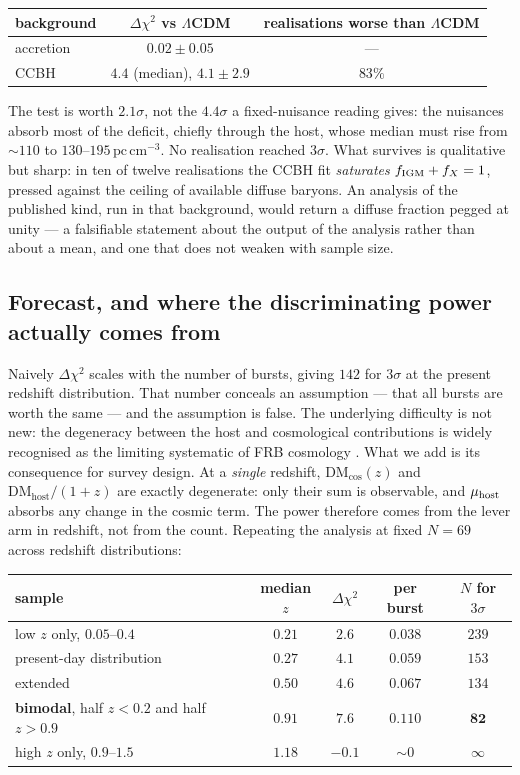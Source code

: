 \documentclass[11pt,a4paper]{article}
\begin{document}
\begin{center}
\begin{tabular}{lcc}
\toprule
background & $\Delta\chi^2$ vs $\Lambda$CDM & realisations worse than $\Lambda$CDM \\
\midrule
accretion & $0.02 \pm 0.05$ & --- \\
CCBH & $4.4$ (median), $4.1\pm2.9$ & $83\%$ \\
\bottomrule
\end{tabular}
\end{center}

The test is worth $2.1\sigma$, not the $4.4\sigma$ a fixed-nuisance reading gives: the nuisances absorb most of the deficit, chiefly
through the host, whose median must rise from $\sim\!110$ to $130$--$195\,\mathrm{pc\,cm^{-3}}$. No
realisation reached $3\sigma$. What survives is qualitative but sharp: in ten of twelve
realisations the CCBH fit \emph{saturates} $f_{\rm IGM}+f_X = 1$, pressed against the ceiling of
available diffuse baryons. An analysis of the published kind, run in that background, would return
a diffuse fraction pegged at unity --- a falsifiable statement about the output of the analysis
rather than about a mean, and one that does not weaken with sample size.

\subsection{Forecast, and where the discriminating power actually comes from}
Naively $\Delta\chi^2$ scales with the number of bursts, giving $142$ for $3\sigma$ at the present
redshift distribution. That number conceals an assumption --- that all bursts are worth the same ---
and the assumption is false. The underlying difficulty is not new: the degeneracy between the host
and cosmological contributions is widely recognised as the limiting systematic of FRB cosmology
\citep{Wang2022,Host2025}. What we add is its consequence for survey design. At a \emph{single}
redshift, $\mathrm{DM_{cos}}(z)$ and $\mathrm{DM_{host}}/(1+z)$ are exactly degenerate: only their
sum is observable, and $\mu_{\rm host}$ absorbs any change in the cosmic term. The power therefore
comes from the lever arm in redshift, not from the count. Repeating the analysis at fixed $N = 69$
across redshift distributions:

\begin{center}
\begin{tabular}{lcccc}
\toprule
sample & median $z$ & $\Delta\chi^2$ & per burst & $N$ for $3\sigma$ \\
\midrule
low $z$ only, $0.05$--$0.4$ & $0.21$ & $2.6$ & $0.038$ & $239$ \\
present-day distribution & $0.27$ & $4.1$ & $0.059$ & $153$ \\
extended & $0.50$ & $4.6$ & $0.067$ & $134$ \\
\textbf{bimodal}, half $z<0.2$ and half $z>0.9$ & $0.91$ & $\mathbf{7.6}$ & $\mathbf{0.110}$ & $\mathbf{82}$ \\
high $z$ only, $0.9$--$1.5$ & $1.18$ & $-0.1$ & $\sim 0$ & $\infty$ \\
\bottomrule
\end{tabular}
\end{center}
\end{document}

